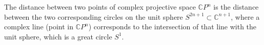 The distance between two points of complex projective space $\mathbb{C}P^n$ is the distance between the two corresponding circles on the unit sphere $S^{2n+1} \subset \mathbb{C}^{n+1}$, where a complex line (point in $\mathbb{C}P^n$) corresponds to the intersection of that line with the unit sphere, which is a great circle $S^1$.
